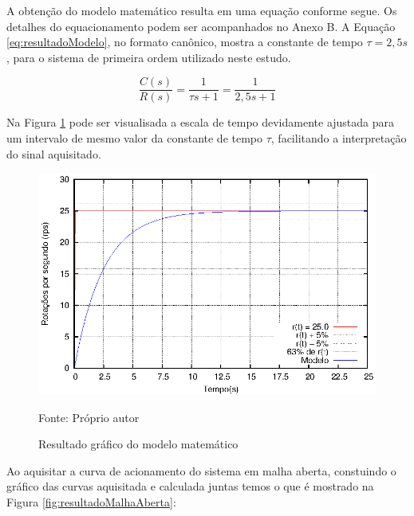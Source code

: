 A obtenção do modelo matemático resulta em uma equação conforme segue.
Os detalhes do equacionamento podem ser acompanhados no Anexo B.
A Equação \ref{eq:resultadoModelo}, no formato canônico,  mostra a constante de tempo $\tau
= 2,5s$, para o sistema de primeira ordem utilizado neste estudo.  

\begin{equation}
  \frac{C(s)}{R(s)} = \frac{1}{\tau s+1} = \frac{1}{2,5 s+1}
\label{eq:resultadoModelo}
\end{equation}

Na Figura \ref{fig:resultadoft} pode ser visualisada a 
escala de tempo devidamente ajustada para um intervalo de mesmo
valor da constante de tempo $\tau$, facilitando a interpretação do
sinal aquisitado.

\begin{figure}[!htb]
\centering
\caption{Resultado gráfico do modelo matemático}
\center\includegraphics[scale=1.3]{./plot/ft.eps}

\label{fig:resultadoft}

{\small Fonte: Próprio autor}
\end{figure}



Ao aquisitar a curva de acionamento do sistema em malha aberta,
constuindo o gráfico das curvas aquisitada e calculada juntas  temos o
que é mostrado na Figura \ref{fig:resultadoMalhaAberta}:


